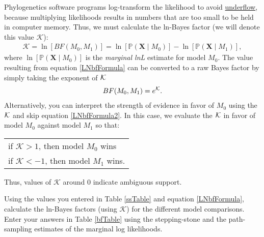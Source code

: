 Phylogenetics software programs log-transform the likelihood to avoid \href{http://en.wikipedia.org/wiki/Arithmetic_underflow}{underflow}, because multiplying likelihoods results in numbers that are too small to be held in computer memory.
Thus, we must calculate the ln-Bayes factor (we will denote this value $\mathcal{K}$):
\begin{align}\label{LNbfFormula}
\mathcal{K}=\ln[BF(M_0,M_1)] = \ln[\mathbb{P}(\mathbf X \mid M_0)]-\ln[\mathbb{P}(\mathbf X \mid M_1)],
\end{align}
where $\ln[\mathbb{P}(\mathbf X \mid M_0)]$ is the \textit{marginal lnL} estimate for model $M_0$. 
The value resulting from equation \ref{LNbfFormula} can be converted to a raw Bayes factor by simply taking the exponent of $\cal{K}$
\begin{align}\label{LNbfFormula2}
BF(M_0,M_1) = e^{\cal{K}}.
\end{align}
Alternatively, you can interpret the strength of evidence in favor of $M_0$ using the $\cal{K}$ and skip equation \ref{LNbfFormula2}. 
In this case, we evaluate the $\cal{K}$ in favor of model $M_0$ against model $M_1$ so that:
\begin{center}
\begin{tabular}{l}
if $\mathcal{K} > 1$, then model $M_0$ wins\\
if $\mathcal{K} < -1$, then model $M_1$ wins.
\end{tabular}
\end{center}
Thus, values of $\mathcal{K}$ around 0 indicate ambiguous support. 


Using the values you entered in Table \ref{ssTable} and equation \ref{LNbfFormula},  calculate the ln-Bayes factors (using $\mathcal{K}$) for the different model comparisons. 
Enter your answers in Table \ref{bfTable} using the stepping-stone and the path-sampling estimates of the marginal log likelihoods. 

